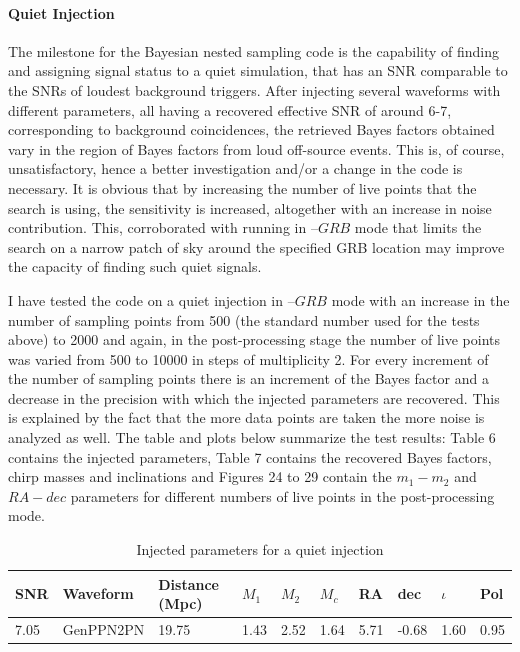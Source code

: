 \documentclass[epsf]{article}
\begin{document}
\paragraph{Quiet Injection}

The milestone for the Bayesian nested sampling code is the capability of finding and assigning signal status to a quiet simulation, that has an SNR comparable to the SNRs of loudest background triggers. After injecting several waveforms with different parameters, all having a recovered effective SNR of around 6-7, corresponding to background coincidences, the retrieved Bayes factors obtained vary in the region of Bayes factors from loud off-source events. This is, of course, unsatisfactory, hence a better investigation and/or a change in the code is necessary. It is obvious that by increasing the number of live points that the search is using, the sensitivity is increased, altogether with an increase in noise contribution. This, corroborated with running in --$GRB$ mode that limits the search on a narrow patch of sky around the specified GRB location may improve the capacity of finding such quiet signals.

I have tested the code on a quiet injection in --$GRB$ mode with an increase in the number of sampling points from 500 (the standard number used for the tests above) to 2000 and again, in the post-processing stage the number of live points was varied from 500 to 10000 in steps of multiplicity 2. For every increment of the number of sampling points there is an increment of the Bayes factor and a decrease in the precision with which the injected parameters are recovered. This is explained by the fact that the more data points are taken the more noise is analyzed as well. The table and plots below summarize the test results: Table 6 contains the injected parameters, Table 7 contains the recovered Bayes factors, chirp masses and inclinations and Figures 24 to 29 contain the $m_1-m_2$ and $RA-dec$ parameters for different numbers of live points in the post-processing mode.

\begin{table}[ht]
 \begin{tabular}{|l|l|l|l|l|l|l|l|l|l|}
 \hline
 \hline
 SNR & Waveform & Distance (Mpc) & $M_1$ & $M_2$ & $M_c$ & RA & dec & $\iota$ & Pol \\
 \hline
 \hline
 7.05 & GenPPN2PN & 19.75 & 1.43 & 2.52 & 1.64 & 5.71 & -0.68 & 1.60 & 0.95  \\
 \hline
 \hline
 \end{tabular} 
 \caption{Injected parameters for a quiet injection}
 \label{Table 6}
\end{table} 
\end{document}
